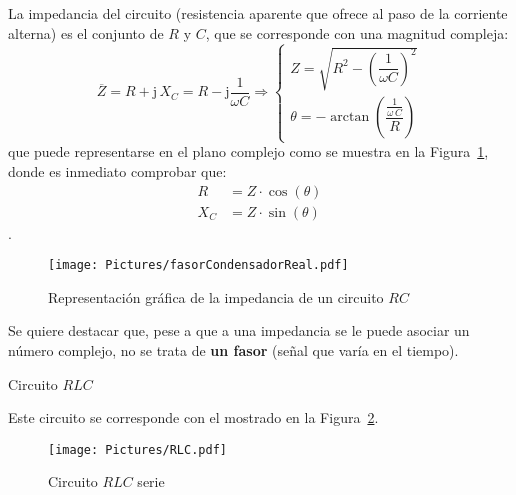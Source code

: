 \documentclass[11pt]{book} %
\makeatletter
\numberwithin{dummy}{section}
\theoremstyle{ocrenumbox}
\theoremstyle{blacknumex}
\theoremstyle{blacknumbox}
\theoremstyle{ocrenum}
\newenvironment{remark}{\par\vspace{10pt}\small %
\begin{list}{}{
\leftmargin=35pt %
\rightmargin=25pt}\item\ignorespaces %
\makebox[-2.5pt]{\begin{tikzpicture}[overlay]
\node[draw=ocre!60,line width=1pt,circle,fill=ocre!25,font=\sffamily\bfseries,inner sep=2pt,outer sep=0pt] at (-15pt,0pt){\textcolor{ocre}{N}};\end{tikzpicture}} %
\advance\baselineskip -1pt}{\end{list}\vskip5pt} %
\renewcommand{\subsection}{\@startsection {subsection}{2}{\z@}
{-3ex \@plus -0.1ex \@minus -.4ex}
{0.5ex \@plus.2ex }
{\normalfont\sffamily\bfseries}}
\newlength\esp
\makeatother
\begin{document}
	La impedancia del circuito (resistencia aparente que ofrece al paso de la corriente alterna) es el conjunto de $R$ y $C$, que se corresponde con una magnitud compleja: 
	\begin{equation}
		\boxed{ \overline{Z} = R + \mathrm{j}\,X_C = R- \mathrm{j}\dfrac{1}{\omega C} \Rightarrow 
			\begin{cases}
				Z=\sqrt{R^2-\left(\dfrac{1}{\omega C} \right)^2}\\
				\theta=-\arctan\left(\dfrac{\frac{1}{\omega\,C}}{R} \right)
		\end{cases}}
	\end{equation}
	que puede representarse en el plano complejo como se muestra en la Figura~\ref{fig.fasorcondensadorreal}, donde es inmediato comprobar que:
	\begin{align*}
		R&=Z\cdot\cos(\theta)\\
		X_C&=Z\cdot\sin(\theta)
	\end{align*}. 
	\begin{figure}[htbp]
		\centering
		\texttt{[image: Pictures/fasorCondensadorReal.pdf]}
		\caption{Representación gráfica de la impedancia de un circuito $RC$}
		\label{fig.fasorcondensadorreal}
	\end{figure}
	
	\begin{remark}
		Se quiere destacar que, pese a que a una impedancia se le puede asociar un número complejo, no se trata de \textbf{un fasor} (señal que varía en el tiempo).
	\end{remark}
	
	\subsection{Circuito $RLC$}\label{sec.RLC}
	
	Este circuito se corresponde con el mostrado en la Figura~\ref{fig.RLC}. 
	\begin{figure}[h]
		\centering
		\texttt{[image: Pictures/RLC.pdf]}
		\caption{Circuito $RLC$ serie}
		\label{fig.RLC}
	\end{figure}
	
\end{document}
